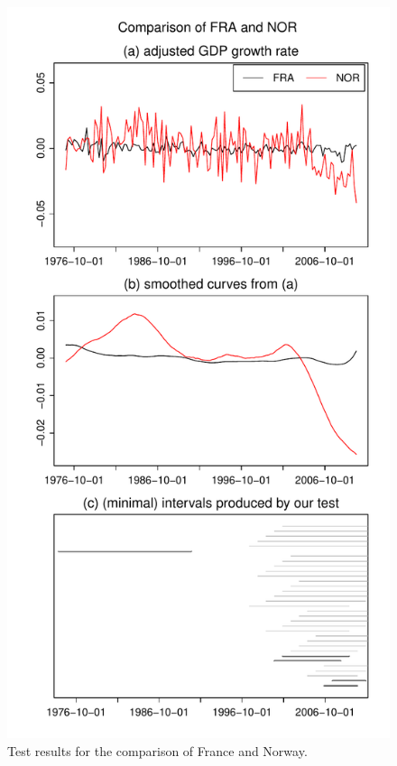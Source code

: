 \documentclass[12pt]{article}
\begin{document}
\begin{figure}
\begin{minipage}[t]{0.24\textwidth}
\includegraphics[width=\textwidth]{output/plots/gdp/FRA_vs_NOR}
\caption{Test results for the comparison of France and Norway.}\label{fig:France:Norway}
\end{minipage}
\hspace{0.1cm}
\begin{minipage}[t]{0.24\textwidth}

\end{minipage}
\end{figure}
\end{document}
